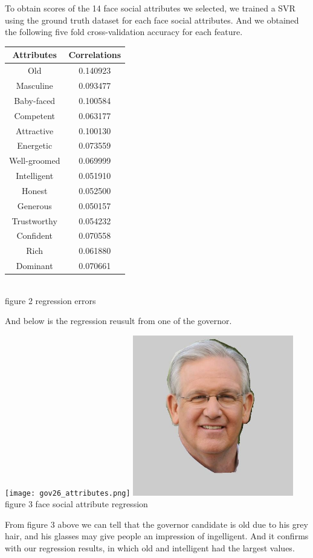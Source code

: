 \documentclass[12pt]{article}
\newenvironment{p3}[2][IV Scoring Face Social Attributes with SVR]{\begin{trivlist}
\item[\hskip \labelsep {\bfseries #1}\hskip \labelsep {\bfseries #2}]}{\end{trivlist}}
\begin{document}
\begin{p3}{}
\item{}
To obtain scores of the 14 face social attributes we selected, we trained a SVR using the ground truth dataset for each face social attributes. And we obtained the following five fold cross-validation accuracy for each feature.\\
\begin{center}
	\begin{tabular}{||c c||} 
		\hline
	    Attributes  & Correlations\\
		\hline
		Old & 0.140923\\
		\hline
		Masculine & 0.093477\\
		\hline
		Baby-faced & 0.100584\\
		\hline
		Competent & 0.063177\\
		\hline
		Attractive & 0.100130\\
		\hline
		Energetic & 0.073559\\
		\hline
		Well-groomed & 0.069999\\
		\hline
		Intelligent & 0.051910\\
		\hline
		Honest & 0.052500\\
		\hline
		Generous & 0.050157\\
		\hline
		Trustworthy & 0.054232\\
		\hline
		Confident & 0.070558\\
		\hline
		Rich & 0.061880\\
		\hline
		Dominant & 0.070661\\
		\hline
	\end{tabular}
	{\\figure 2 regression errors}
\end{center}
And below is the regression reusult from one of the governor.\\
\begin{center}
		\texttt{[image: gov26\_attributes.png]}
		\includegraphics[height=7cm]{img-elec/governor/G0026.jpg}
		figure 3 face social attribute regression	
\end{center}
From figure 3 above we can tell that the governor candidate is old due to his grey hair, and his glasses may give people an impression of ingelligent. And it confirms with our regression results, in which old and intelligent had the largest values.
\item{}
\end{p3}
\end{document}
